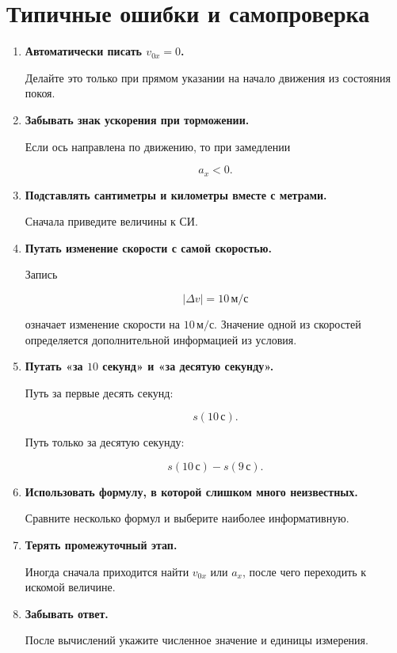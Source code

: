 \documentclass[a4paper,12pt]{article}
\newcommand{\ms}{\,\text{м/с}}
\begin{document}
\clearpage


\section*{Типичные ошибки и самопроверка}

\begin{enumerate}

  \item
  \textbf{Автоматически писать $v_{0x}=0$.}

  Делайте это только при прямом указании
  на начало движения из состояния покоя.

  \item
  \textbf{Забывать знак ускорения при торможении.}

  Если ось направлена по движению,
  то при замедлении

  \[
  a_x<0.
  \]

  \item
  \textbf{Подставлять сантиметры и километры
  вместе с метрами.}

  Сначала приведите величины к СИ.

  \item
  \textbf{Путать изменение скорости с самой скоростью.}

  Запись

  \[
  |\Delta v|=10\ms
  \]

  означает изменение скорости на $10\ms$.
  Значение одной из скоростей определяется
  дополнительной информацией из условия.

  \item
  \textbf{Путать «за $10$ секунд»
  и «за десятую секунду».}

  Путь за первые десять секунд:

  \[
  s(10\,\text{с}).
  \]

  Путь только за десятую секунду:

  \[
  s(10\,\text{с})-s(9\,\text{с}).
  \]

  \item
  \textbf{Использовать формулу,
  в которой слишком много неизвестных.}

  Сравните несколько формул
  и выберите наиболее информативную.

  \item
  \textbf{Терять промежуточный этап.}

  Иногда сначала приходится найти
  $v_{0x}$ или $a_x$,
  после чего переходить к искомой величине.

  \item
  \textbf{Забывать ответ.}

  После вычислений укажите
  численное значение
  и единицы измерения.

\end{enumerate}
\end{document}
